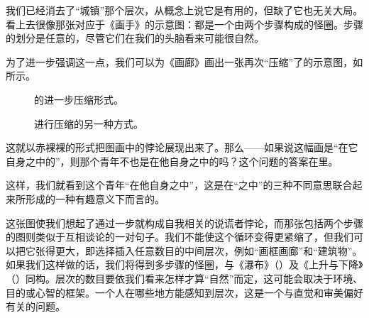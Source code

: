 我们已经消去了“城镇”那个层次，从概念上说它是有用的，但缺了它也无关大局。看上去很像那张对应于《画手》的示意图：都是一个由两个步骤构成的怪圈。步骤的划分是任意的，尽管它们在我们的头脑看来可能很自然。

为了进一步强调这一点，我们可以为《画廊》画出一张再次“压缩”了的示意图，如所示。

\begin{figure}
\begin{lrbox}{6}%
\end{lrbox}
\begin{lrbox}{8}%
\end{lrbox}
\captionsetup{margin=2\ccwd}
\begin{floatrow}
          {\caption{的进一步压缩形式。}}
          {\caption[对进行压缩的另一种方式。]{进行压缩的另一种方式。}}
\end{floatrow}
\end{figure}

这就以赤裸裸的形式把图画中的悖论展现出来了。那么——如果说这幅画是“在它自身之中的”，则那个青年不也是在他自身之中的吗？这个问题的答案在里。

这样，我们就看到这个青年“在他自身之中”，这是在“之中”的三种不同意思联合起来所形成的一种有趣意义下而言的。

这张图使我们想起了通过一步就构成自我相关的说谎者悖论，而那张包括两个步骤的图则类似于互相谈论的一对句子。我们不能使这个循环变得更紧缩了，但我们可以把它张得更大，即选择插入任意数目的中间层次，例如“画框画廊”和“建筑物”。如果我们这样做的话，我们将得到多步骤的怪圈，与《瀑布》（）及《上升与下降》（）同构。层次的数目要依我们看来怎样才算“自然”而定，这可能会取决于环境、目的或心智的框架。一个人在哪些地方能感知到层次，这是一个与直觉和审美偏好有关的问题。

